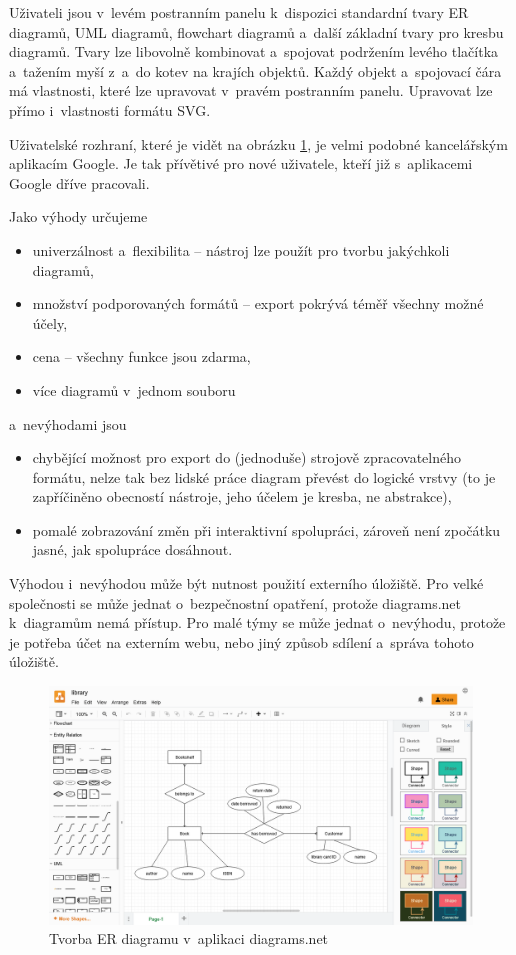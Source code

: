 Uživateli jsou v~levém postranním panelu k~dispozici standardní tvary ER
diagramů, UML diagramů, flowchart diagramů a~další základní tvary pro kresbu
diagramů. Tvary lze libovolně kombinovat a~spojovat podržením levého tlačítka
a~tažením myší z~a~do kotev na krajích objektů. Každý objekt a~spojovací čára má
vlastnosti, které lze upravovat v~pravém postranním panelu. Upravovat lze přímo
i~vlastnosti formátu SVG.

Uživatelské rozhraní, které je vidět na obrázku \ref{fig:diagrams.net}, je velmi
podobné kancelářským aplikacím Google. Je tak přívětivé pro nové uživatele,
kteří již s~aplikacemi Google dříve pracovali.

Jako výhody určujeme
\begin{itemize}
  \item univerzálnost a~flexibilita -- nástroj lze použít pro tvorbu jakýchkoli
  diagramů,
  \item množství podporovaných formátů -- export pokrývá téměř všechny možné
  účely,
  \item cena -- všechny funkce jsou zdarma,
  \item více diagramů v~jednom souboru
\end{itemize}
a~nevýhodami jsou
\begin{itemize}
  \item chybějící možnost pro export do (jednoduše) strojově zpracovatelného
  formátu, nelze tak bez lidské práce diagram převést do logické vrstvy (to je
  zapříčiněno obecností nástroje, jeho účelem je kresba, ne abstrakce),
  \item pomalé zobrazování změn při interaktivní spolupráci, zároveň není
  zpočátku jasné, jak spolupráce dosáhnout.
\end{itemize}

Výhodou i~nevýhodou může být nutnost použití externího úložiště. Pro velké
společnosti se může jednat o~bezpečnostní opatření, protože diagrams.net
k~diagramům nemá přístup. Pro malé týmy se může jednat o~nevýhodu, protože je
potřeba účet na externím webu, nebo jiný způsob sdílení a~správa tohoto
úložiště.

\begin{figure}
  \centering
  \includegraphics[width=\textwidth]{../img/diagrams.net.png}
  \caption{Tvorba ER diagramu v~aplikaci diagrams.net}
  \label{fig:diagrams.net}
\end{figure}

